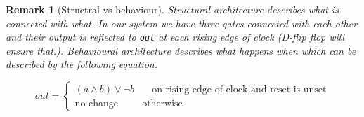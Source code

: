\documentclass[a4paper,10pt]{article}
\newtheorem{remark}{Remark}
\begin{document}
\begin{remark}[Structral vs behaviour]
  Structural architecture describes \emph{what is connected with what}. In our
  system we have three gates connected with each other and their output is
  reflected to \texttt{out} at each rising edge of clock (D-flip flop will
  ensure that.). Behavioural architecture describes \emph{what happens when}
  which can be described by the following equation.

  \begin{equation}
  out = 
  \begin{cases}
    (a \land b) \lor \neg b & \quad \text{on rising edge of clock and reset
    is unset}\\
    \text{no change} & \text{otherwise} 
  \end{cases}
  \end{equation}
\end{remark}
\end{document}
